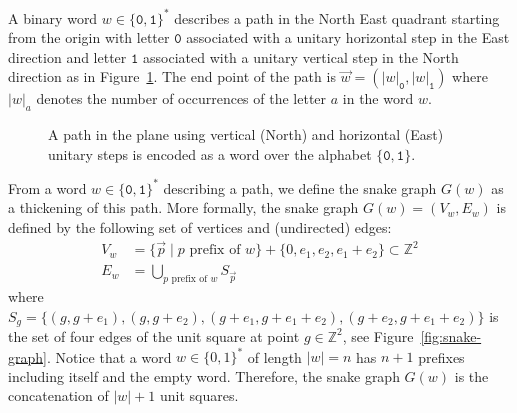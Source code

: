 \documentclass[a4paper,12pt]{amsart}
\newcommand{\Z}{\mathbb{Z}}
\newcommand{\0}{\mathtt{0}}
\newcommand{\1}{\mathtt{1}}
\newcommand{\2}{\mathtt{2}}
\newcommand{\3}{\mathtt{3}}
\begin{document}
A binary word $w\in\{\0,\1\}^*$ describes a path in the North East quadrant
starting from the origin with
letter $\0$ associated with a unitary horizontal step in the East direction
and
letter $\1$ associated with a unitary vertical step in the North direction
as in Figure~\ref{fig:legend01}.
The end point of the path is
$\overrightarrow{w}=(|w|_\0,|w|_\1)$
where $|w|_a$ denotes the number of occurrences of the letter $a$ in the word $w$.
\begin{figure}[h]
\begin{center}
    \qquad
    \qquad
\end{center}
    \caption{A path in the plane using vertical (North) and horizontal (East) unitary steps
    is encoded as a word over the alphabet $\{\0,\1\}$.}
    \label{fig:legend01}
\end{figure}

From a word $w\in\{\0,\1\}^*$ describing a path, we define the snake graph $G(w)$ as a thickening of
this path. More formally, the snake graph $G(w)=(V_w,E_w)$ is defined by the
following set of vertices and (undirected) edges:
\begin{align*}
    V_w&=\{\overrightarrow{p}\mid \text{$p$ prefix of $w$}\}
    + \{0, e_1,e_2, e_1+e_2\} \subset\Z^2\\
    E_w&=
    \bigcup_{\text{$p$ prefix of $w$}}
       S_{\overrightarrow{p}}
\end{align*}
where
$
 S_{g}
 =    \{(g,    g+e_1),
        (g,    g+e_2),
        (g+e_1,g+e_1+e_2),
        (g+e_2,g+e_1+e_2)\}
$
is the set of four edges of the unit square at point $g\in\Z^2$, see
Figure~\ref{fig:snake-graph}.
Notice that a word $w\in\{0,1\}^*$ of length $|w|=n$ has $n+1$ prefixes including
itself and the empty word. Therefore, the snake graph $G(w)$ is the
concatenation of $|w|+1$ unit squares.
\end{document}
